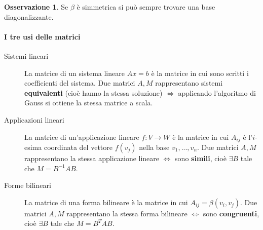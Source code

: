\documentclass[a4paper]{article}
\theoremstyle{definition}
\newtheorem*{oss}{Osservazione}
\begin{document}
	\begin{oss}
		Se $\beta$ è simmetrica si può sempre trovare una base diagonalizzante.
	\end{oss}

	\paragraph{I tre usi delle matrici}
	\begin{description}
		\item[Sistemi lineari] La matrice di un sistema lineare $Ax = b$ è la matrice in cui sono scritti i coefficienti del sistema.
		Due matrici $A, M$ rappresentano sistemi \textbf{equivalenti} (cioè hanno la stessa soluzione) $\Leftrightarrow$ applicando l'algoritmo di Gauss si ottiene la stessa matrice a scala.
		\item[Applicazioni lineari] La matrice di un'applicazione lineare $f: V \to W$ è la matrice in cui $A_{ij}$ è l'$i$-esima coordinata del vettore $f(v_j)$ nella base $v_1, ..., v_n$.
		Due matrici $A, M$ rappresentano la stessa applicazione lineare $\Leftrightarrow$ sono \textbf{simili}, cioè $\exists B$ tale che $M = B^{-1}AB$.
		\item[Forme bilineari] La matrice di una forma bilineare è la matrice in cui $A_{ij} = \beta(v_i, v_j)$.
		Due matrici $A, M$ rappresentano la stessa forma bilineare $\Leftrightarrow$ sono \textbf{congruenti}, cioè $\exists B$ tale che $M = B^TAB$.
	\end{description}
\end{document}
